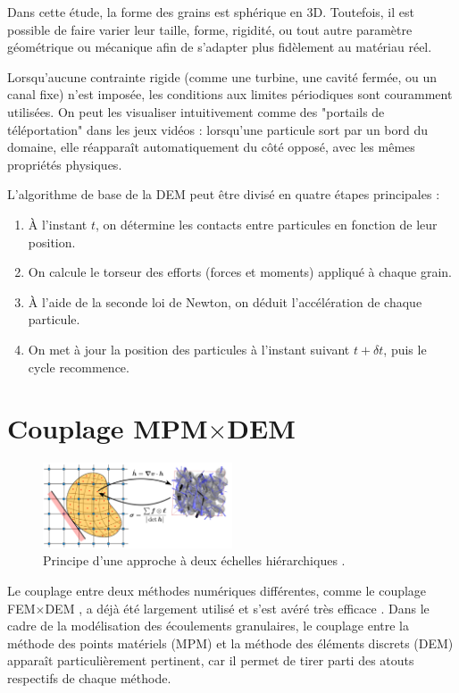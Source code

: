 \documentclass[a4paper,12pt]{report}
\begin{document}
Dans cette étude, la forme des grains est sphérique en 3D. Toutefois, il est possible de faire varier leur taille, forme, rigidité, ou tout autre paramètre géométrique ou mécanique afin de s’adapter plus fidèlement au matériau réel.

Lorsqu’aucune contrainte rigide (comme une turbine, une cavité fermée, ou un canal fixe) n’est imposée, les conditions aux limites périodiques sont couramment utilisées. On peut les visualiser intuitivement comme des "portails de téléportation" dans les jeux vidéos : lorsqu'une particule sort par un bord du domaine, elle réapparaît automatiquement du côté opposé, avec les mêmes propriétés physiques.

L’algorithme de base de la DEM peut être divisé en quatre étapes principales :

\begin{enumerate}
    \item À l’instant $t$, on détermine les contacts entre particules en fonction de leur position.
    \item On calcule le torseur des efforts (forces et moments) appliqué à chaque grain.
    \item À l’aide de la seconde loi de Newton, on déduit l’accélération de chaque particule.
    \item On met à jour la position des particules à l’instant suivant $t + \delta t$, puis le cycle recommence.
\end{enumerate}


\section{Couplage MPM$\times$DEM}

\begin{figure}[h]
\centering
\includegraphics[width=0.5\textwidth]{CouplageMPMxDEM.png}
\caption{Principe d’une approche à deux échelles hiérarchiques  \citep{projetderecherche}.}
\label{fig:MPMxDEM}
\end{figure}

Le couplage entre deux méthodes numériques différentes, comme le couplage FEM$\times$DEM  \citep{nguyen2013modelisation}, a déjà été largement utilisé et s’est avéré très efficace  \citep{Nguyen09092024}.  
Dans le cadre de la modélisation des écoulements granulaires, le couplage entre la méthode des points matériels (MPM) et la méthode des éléments discrets (DEM) apparaît particulièrement pertinent, car il permet de tirer parti des atouts respectifs de chaque méthode.
\end{document}
